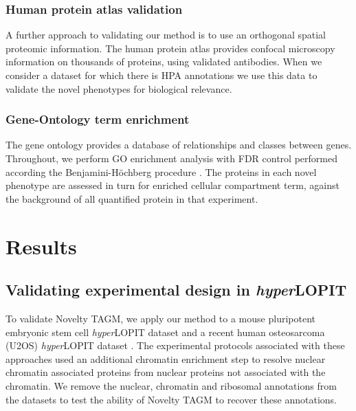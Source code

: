 \documentclass[12pt,english]{article}
\begin{document}
\subsubsection{Human protein atlas validation}
A further approach to validating our method is to use an orthogonal spatial proteomic information. The human protein atlas \citep{Thul:2017, Sullivan:2018} provides confocal microscopy information on thousands of proteins, using validated antibodies. When we consider a dataset for which there is HPA annotations we use this data to validate the novel phenotypes for biological relevance. 
\subsubsection{Gene-Ontology term enrichment}
The gene ontology provides a database of relationships and classes between genes. Throughout, we perform GO enrichment analysis with FDR control performed according the Benjamini-H\"ochberg procedure \citep{FDR:1995,Ashburner:2000,Yu:2012}. The proteins in each novel phenotype are assessed in turn for enriched cellular compartment term, against the background of all quantified protein in that experiment. 



\clearpage
\section{Results}
\subsection{Validating experimental design in \textit{hyper}LOPIT}
To validate Novelty TAGM, we apply our method to a mouse pluripotent embryonic stem cell \textit{hyper}LOPIT dataset \citep{hyper} and a recent human osteosarcoma (U2OS) \textit{hyper}LOPIT dataset \citep{Thul:2017, DC:2018}. The experimental protocols associated with these approaches used an additional chromatin enrichment step to resolve nuclear chromatin associated proteins from nuclear proteins not associated with the chromatin. We remove the nuclear, chromatin and ribosomal annotations from the datasets to test the ability of Novelty TAGM to recover these annotations.
\end{document}

